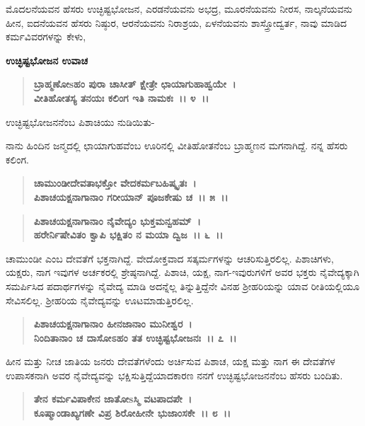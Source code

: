 ಮೊದಲನೆಯವನ ಹೆಸರು ಉಚ್ಛಿಷ್ಟಭೋಜನ, ಎರಡನೆಯವನು ಅಭದ್ರ, ಮೂರನೆಯವನು ನೀರಸ, ನಾಲ್ಕನೆಯವನು ಹೀನ, ಐದನೆಯವನ ಹೆಸರು ನಿಷ್ಠುರ, ಆರನೆಯವನು ನಿರಾಶ್ರಯ, ಏಳನೆಯವನು ಶಾಸ್ತ್ರೋದ್ವರ್ತ, ನಾವು ಮಾಡಿದ ಕರ್ಮವಿವರಗಳನ್ನು ಕೇಳು,

\noindent
\textbf{ಉಚ್ಛಿಷ್ಟಭೋಜನ ಉವಾಚ\enginline{-}}

\begin{verse}
\textbf{ಬ್ರಾಹ್ಮಣೋsಹಂ ಪುರಾ ಚಾಸೀತ್ ಕ್ಷೇತ್ರೇ ಛಾಯಾಗುಹಾಹ್ವಯೇ~।}\\\textbf{ವೀತಿಹೋತಸ್ಯ ತನಯಃ ಕಲಿಂಗ ಇತಿ ನಾಮಕಃ~।। ೪~।। }
\end{verse}

\begin{flushleft}
ಉಚ್ಛಿಷ್ಟಭೋಜನನೆಂಬ ಪಿಶಾಚಿಯು ನುಡಿಯಿತು-
\end{flushleft}

ನಾನು ಹಿಂದಿನ ಜನ್ಮದಲ್ಲಿ ಛಾಯಾಗುಹವೆಂಬ ಊರಿನಲ್ಲಿ ವೀತಿಹೋತನೆಂಬ ಬ್ರಾಹ್ಮಣನ ಮಗನಾಗಿದ್ದೆ. ನನ್ನ ಹೆಸರು ಕಲಿಂಗ.

\begin{verse}
\textbf{ಚಾಮುಂಡೀದೇವತಾಭಕ್ತೋ ವೇದಕರ್ಮಬಹಿಷ್ಕೃತಃ~।}\\\textbf{ಪಿಶಾಚಯಕ್ಷನಾಗಾನಾಂ ಗರೀಯಾನ್ ಪೂಜಕೇಷು ಚ~।। ೫~।। }
\end{verse}

\begin{verse}
\textbf{ಪಿಶಾಚಯಕ್ಷನಾಗಾನಾಂ ನೈವೇದ್ಯಂ ಭುಕ್ತಮನ್ವಹಮ್~।}\\\textbf{ಹರೇರ್ನಿಷೇವಿತಂ ಕ್ವಾಪಿ ಭಕ್ಷಿತಂ ನ ಮಯಾ ದ್ವಿಜ~।। ೬~।।}
\end{verse}

ಚಾಮುಂಡೀ ಎಂಬ ದೇವತೆಗೆ ಭಕ್ತನಾಗಿದ್ದೆ. ವೇದೋಕ್ತವಾದ ಸತ್ಕರ್ಮಗಳನ್ನು ಆಚರಿಸುತ್ತಿರಲಿಲ್ಲ. ಪಿಶಾಚಿಗಳು, ಯಕ್ಷರು, ನಾಗ ಇವುಗಳ ಅರ್ಚಕರಲ್ಲಿ ಶ್ರೇಷ್ಠನಾಗಿದ್ದೆ. ಪಿಶಾಚಿ, ಯಕ್ಷ, ನಾಗ-ಇವುರುಗಳಿಗೆ ಅವರ ಭಕ್ತರು ನೈವೇದ್ಯಕ್ಕಾಗಿ ಸಮರ್ಪಿಸಿದ ಪದಾರ್ಥಗಳನ್ನು ನೈವೇದ್ಯ ಮಾಡಿ ಅದನ್ನೆಲ್ಲ ತಿನ್ನುತ್ತಿದ್ದೆನೇ ವಿನಹ ಶ‍್ರೀಹರಿಯನ್ನು ಯಾವ ರೀತಿಯಲ್ಲಿಯೂ ಸೇವಿಸಲಿಲ್ಲ. ಶ‍್ರೀಹರಿಯ ನೈವೇದ್ಯವನ್ನು ಊಟಮಾಡುತ್ತಿರಲಿಲ್ಲ.

\begin{verse}
\textbf{ಪಿಶಾಚಯಕ್ಷನಾಗಾನಾಂ ಹೀನಜಾನಾಂ ಮುನೀಶ್ವರ~।}\\\textbf{ನಿಂದಿತಾನಾಂ ಚ ದಾಸೋಽಹಂ ತತ ಉಚ್ಛಿಷ್ಟಭೋಜನಃ~।। ೭~।।}
\end{verse}

ಹೀನ ಮತ್ತು ನೀಚ ಜಾತಿಯ ಜನರು ದೇವತೆಗಳೆಂದು ಅರ್ಚಿಸುವ ಪಿಶಾಚ, ಯಕ್ಷ ಮತ್ತು ನಾಗ ಈ ದೇವತೆಗಳ ಉಪಾಸಕನಾಗಿ ಅವರ ನೈವೇದ್ಯವನ್ನು ಭಕ್ಷಿಸುತ್ತಿದ್ದೆಯಾದಕಾರಣ ನನಗೆ ಉಚ್ಛಿಷ್ಟಭೋಜನನೆಂಬ ಹೆಸರು ಬಂದಿತು.

\begin{verse}
\textbf{ತೇನ ಕರ್ಮವಿಪಾಕೇನ ಜಾತೋsಸ್ಮಿ ವಟಪಾದಪೇ~।}\\\textbf{ಕೂಷ್ಮಾಂಡಾಖ್ಯಗಣೇ ವಿಪ್ರ ಶಿರೋಹೀನೇ ಭುಜಾಂಸಕೇ~।। ೮~।।}
\end{verse}

